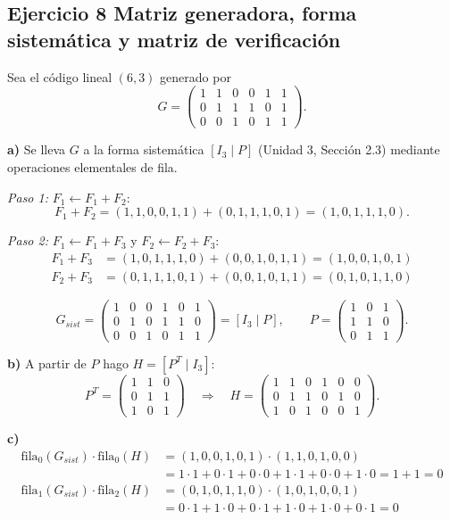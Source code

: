 \documentclass[11pt]{article}
\begin{document}
\subsection*{Ejercicio 8 Matriz generadora, forma sistemática y matriz de verificación}

Sea el código lineal $(6,3)$ generado por
$$G = \begin{pmatrix} 1&1&0&0&1&1 \\ 0&1&1&1&0&1 \\ 0&0&1&0&1&1 \end{pmatrix}.$$

\textbf{a)} Se lleva $G$ a la forma sistemática $[I_3\mid P]$ (Unidad 3, Sección 2.3) mediante
operaciones elementales de fila. 

\emph{Paso 1:} $F_1 \leftarrow F_1+F_2$:
$$F_1+F_2 = (1,1,0,0,1,1)+(0,1,1,1,0,1) = (1,0,1,1,1,0).$$

\emph{Paso 2:} $F_1 \leftarrow F_1+F_3$ y $F_2 \leftarrow F_2+F_3$:
\begin{align*}
F_1+F_3 &= (1,0,1,1,1,0)+(0,0,1,0,1,1) = (1,0,0,1,0,1) \\
F_2+F_3 &= (0,1,1,1,0,1)+(0,0,1,0,1,1) = (0,1,0,1,1,0)
\end{align*}


$$G_{sist} = \begin{pmatrix} 1&0&0&1&0&1 \\ 0&1&0&1&1&0 \\ 0&0&1&0&1&1 \end{pmatrix} = [I_3 \mid P], \qquad
P = \begin{pmatrix} 1&0&1 \\ 1&1&0 \\ 0&1&1 \end{pmatrix}.$$

\textbf{b)} A partir de $P$ hago $H=[P^T \mid I_3]$:
$$P^T = \begin{pmatrix} 1&1&0 \\ 0&1&1 \\ 1&0&1 \end{pmatrix}
\quad\Longrightarrow\quad
H = \begin{pmatrix} 1&1&0&1&0&0 \\ 0&1&1&0&1&0 \\ 1&0&1&0&0&1 \end{pmatrix}.$$

\textbf{c)} 
\begin{align*}
\text{fila}_0(G_{sist})\cdot\text{fila}_0(H) &= (1,0,0,1,0,1)\cdot(1,1,0,1,0,0) \\
&= 1{\cdot}1+0{\cdot}1+0{\cdot}0+1{\cdot}1+0{\cdot}0+1{\cdot}0 = 1+1 = 0 \\[4pt]
\text{fila}_1(G_{sist})\cdot\text{fila}_2(H) &= (0,1,0,1,1,0)\cdot(1,0,1,0,0,1) \\
&= 0{\cdot}1+1{\cdot}0+0{\cdot}1+1{\cdot}0+1{\cdot}0+0{\cdot}1 = 0
\end{align*}
\end{document}
